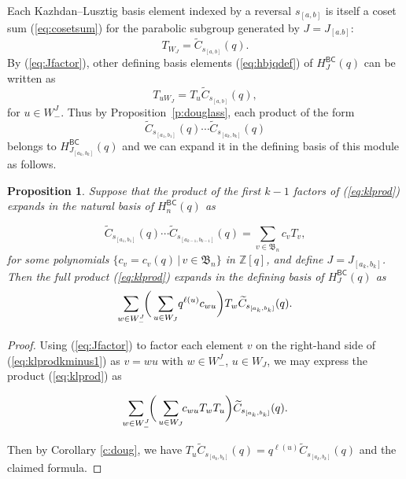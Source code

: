\documentclass[12pt]{amsart}
\newtheorem{prop}[thm]{Proposition}
\theoremstyle{definition}
\numberwithin{equation}{section}
\newcommand{\bn}{\mathfrak{B}_n}
\newcommand{\hbnq}{H_n^{\msfBC}(q)}
\newcommand{\hbjq}{H_J^{\msfBC}(q)}
\newcommand{\Wejm}{W^J_-}
\newcommand{\wtc}[2]{\widetilde{C}_{#1}(#2)}
\newcommand{\ntnsp}{\negthinspace}
\newcommand{\ntksp}{\negthickspace}
\newcommand{\msfBC}{\mathsf{BC}}
\begin{document}
Each Kazhdan--Lusztig basis element %
indexed by a reversal $s_{[a,b]}$ is itself a coset sum (\ref{eq:cosetsum}) for the parabolic subgroup generated by $J = J_{[a.b]}$:
\begin{equation}
T_{W_J} = 
    \wtc{s_{[a,b]}}q.
\end{equation}
By (\ref{eq:Jfactor}), other defining basis elements (\ref{eq:hbjqdef}) of $\hbjq$ can be written as
\begin{equation}\label{eq:TuWJ}
    T_{uW_J} = T_u \wtc{s_{[a,b]}} q,
\end{equation}
for $u \in \Wejm$.
Thus by Proposition~\ref{p:douglass}, each product of the form
    \begin{equation}\label{eq:klprod}
        \wtc{s_{[a_1,b_1]}}q \cdots \wtc{s_{[a_{k},b_{k}]}}q 
    \end{equation}
belongs to $H^{\msfBC}_{J_{[a_k,b_k]}}(q)$ and we can expand it in the defining basis of this module as follows.

\begin{prop}\label{p:klprodcosetexpansion} 
Suppose that the product of the first $k-1$ factors of (\ref{eq:klprod})
expands in the natural basis of $\hbnq$
as

\begin{equation}\label{eq:klprodkminus1}
        \wtc{s_{[a_1,b_1]}}q \cdots \wtc{s_{[a_{k-1},b_{k-1}]}}q = \sum_{v \in \bn} c_v T_v,
    \end{equation}
    for some polynomials $\{ c_v = c_v(q)\,|\, v \in \bn \}$ in $\mathbb Z[q]$,
    and define $J = J_{[a_k,b_k]}$. Then the full product (\ref{eq:klprod})
expands in the defining basis of $\hbjq$ as
\begin{equation}\label{eq:klprodcosetexpansion}
\sum_{w \in \Wejm} \ntksp \bigg( \sum_{u \in  W_{J}} \ntnsp q^{\ell(u)} c_{wu} \bigg) T_w \wtc {s_{[a_k,b_k]}} q.
\end{equation}
\end{prop}
\begin{proof}
Using
(\ref{eq:Jfactor}) to factor each element $v$ on the right-hand side of 
(\ref{eq:klprodkminus1}) as $v = wu$ with $w \in \Wejm$, $u \in W_J$,
we may express the product (\ref{eq:klprod}) as

\begin{equation*}  
\sum_{w \in \Wejm} \ntksp \bigg( \sum_{u \in  W_{J}} \ntksp c_{wu} T_w T_u \bigg) \wtc 
 {s_{[a_k,b_k]}} q.
\end{equation*}

Then by Corollary \ref{c:doug}, 
we have $T_u \wtc{s_{[a_k,b_k]}}q
=
q^{\ell(u)}\wtc{s_{[a_k,b_k]}}q$ and the claimed formula.
\end{proof}
\end{document}
